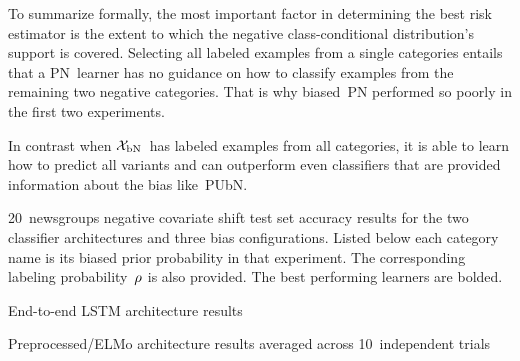 To summarize formally, the most important factor in determining the best risk estimator is the extent to which the negative class-conditional distribution's support is covered.  Selecting all labeled examples from a single categories entails that a PN~learner has no guidance on how to classify examples from the remaining two negative categories.  That is why biased~PN performed so poorly in the first two experiments.

In contrast when $\mathcal{X}_{\textnormal{bN}}$~has labeled examples from all categories, it is able to learn how to predict all variants and can outperform even classifiers that are provided information about the bias like~PUbN.

\begin{table}[t]
  \caption{20~newsgroups negative covariate shift test set accuracy results for the two classifier architectures and three bias configurations. Listed below each category name is its biased prior probability in that experiment. The corresponding labeling probability~$\rho$ is also provided. The best performing learners are bolded.}\label{tab:ExperimentalResults}
  \begin{subtable}[t]{\textwidth}
    \centering
    \caption{End-to-end LSTM architecture results}\label{tab:ExperimentalResults:LSTM}
    
  \end{subtable}

  \begin{subtable}[t]{\textwidth}
    \centering
    \caption{Preprocessed\-/ELMo architecture results averaged across 10~independent trials}\label{tab:ExperimentalResults:ELMo}
    
  \end{subtable}
\end{table}
